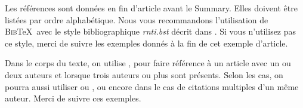\documentclass[a4paper,pagenum,french,showlayout]{rnti}
\begin{document}
Les références sont données en fin d'article avant le
\guilo{}Summary\guilf{}. Elles doivent être listées par ordre
alphabétique.  Nous vous recommandons l'utilisation de
\textsc{Bib}\TeX\ avec le style bibliographique \textit{rnti.bst}
décrit dans \citet{ritschard:2005rnti}. Si vous n'utilisez pas ce
style, merci de suivre les exemples donnés à la fin de cet exemple
d'article.

Dans le corps du texte, on utilise \citet{thSau00}, \citet{HolWil90}
pour faire référence à un article avec un ou deux auteurs et
\citet{lioni01} lorsque trois auteurs ou plus sont présents.  Selon
les cas, on pourra aussi utiliser \citep{thSau00} ou
\citep[voir][chapitre 4]{brei:frie:olsh:ston:1984}, ou encore
\citet{quin:1986ID3,quin:1993} dans le cas de citations multiples
d'un même auteur. Merci de suivre ces exemples.






\appendix


\Fr
\end{document}
